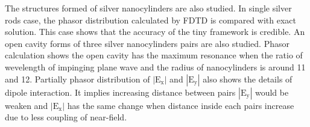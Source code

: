 \documentclass[openany]{book}
\begin{document}
The structures formed of silver nanocylinders are also studied. In single silver rods case, the phasor distribution
calculated by FDTD is compared with exact solution. This case shows that the accuracy of the tiny framework is
credible. An open cavity forms of three silver nanocylinders pairs are also studied. Phasor calculation shows the open
cavity has the maximum resonance when the ratio of wevelength of impinging plane wave and the radius of nanocylinders is
around 11 and 12. Partially phasor distribution of $|\mathrm{E_x}|$ and $|\mathrm{E_y}|$ also shows the details of
dipole interaction. It implies increasing distance between pairs $|\mathrm{E_y}|$ would be weaken and $|\mathrm{E_x}|$
has the same change when distance inside each pairs increase due to less coupling of near-field.






\backmatter

\end{document}
